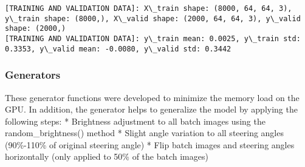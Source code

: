 \documentclass[11pt]{article}
\begin{document}
    \begin{Verbatim}[commandchars=\\\{\}]
[TRAINING AND VALIDATION DATA]: X\_train shape: (8000, 64, 64, 3), y\_train shape: (8000,), X\_valid shape: (2000, 64, 64, 3), y\_valid shape: (2000,)
[TRAINING AND VALIDATION DATA]: y\_train mean: 0.0025, y\_train std: 0.3353, y\_valid mean: -0.0080, y\_valid std: 0.3442

    \end{Verbatim}

    \subsubsection{Generators}\label{generators}

These generator functions were developed to minimize the memory load on
the GPU. In addition, the generator helps to generalize the model by
applying the following steps: * Brightness adjustment to all batch
images using the random\_brightness() method * Slight angle variation to
all steering angles (90\%-110\% of original steering angle) * Flip batch
images and steering angles horizontally (only applied to 50\% of the
batch images)
\end{document}
